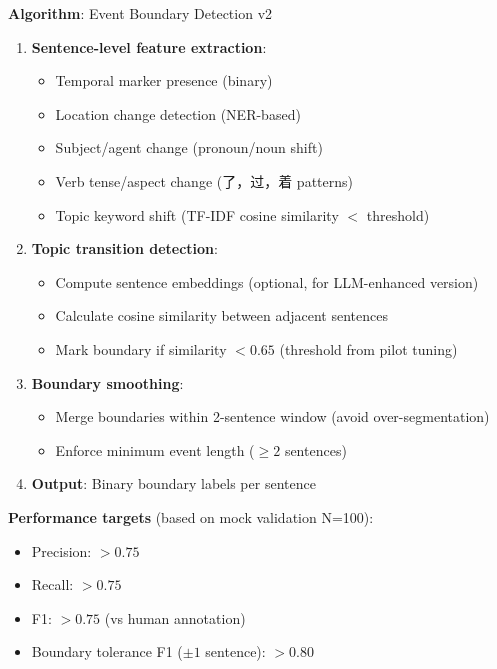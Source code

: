 \documentclass[11pt]{article}
\begin{document}
\textbf{Algorithm}: Event Boundary Detection v2

\begin{enumerate}
    \item \textbf{Sentence-level feature extraction}:
    \begin{itemize}
        \item Temporal marker presence (binary)
        \item Location change detection (NER-based)
        \item Subject/agent change (pronoun/noun shift)
        \item Verb tense/aspect change (了，过，着 patterns)
        \item Topic keyword shift (TF-IDF cosine similarity $<$ threshold)
    \end{itemize}
    
    \item \textbf{Topic transition detection}:
    \begin{itemize}
        \item Compute sentence embeddings (optional, for LLM-enhanced version)
        \item Calculate cosine similarity between adjacent sentences
        \item Mark boundary if similarity $< 0.65$ (threshold from pilot tuning)
    \end{itemize}
    
    \item \textbf{Boundary smoothing}:
    \begin{itemize}
        \item Merge boundaries within 2-sentence window (avoid over-segmentation)
        \item Enforce minimum event length ($\ge 2$ sentences)
    \end{itemize}
    
    \item \textbf{Output}: Binary boundary labels per sentence
\end{enumerate}

\textbf{Performance targets} (based on mock validation N=100):
\begin{itemize}
    \item Precision: $> 0.75$
    \item Recall: $> 0.75$
    \item F1: $> 0.75$ (vs human annotation)
    \item Boundary tolerance F1 ($\pm 1$ sentence): $> 0.80$
\end{itemize}
\end{document}

